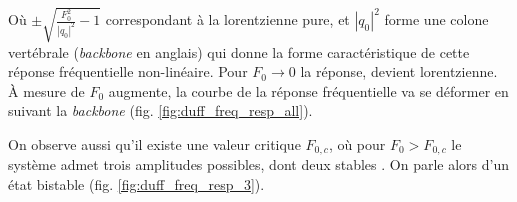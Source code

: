 %
Où $\pm \sqrt{\frac{F_0^2}{|q_0|^2} - 1 }$ correspondant à la lorentzienne pure, et $|q_0|^2$ forme 
une colone vertébrale (\emph{backbone} en anglais) qui donne la forme caractéristique de cette réponse fréquentielle non-linéaire.
%
Pour $F_0 \to 0$ la réponse, devient lorentzienne. À mesure de $F_0$ augmente, la courbe de la réponse fréquentielle va se déformer en suivant la \emph{backbone} (fig. \ref{fig:duff_freq_resp_all}).

On observe aussi qu'il existe une valeur critique $F_{0,c}$, où pour $F_0 > F_{0,c}$ le système admet trois amplitudes possibles, dont deux stables \cite{landau_mechanics_1976}. On parle alors d'un état bistable (fig. \ref{fig:duff_freq_resp_3}).
%
